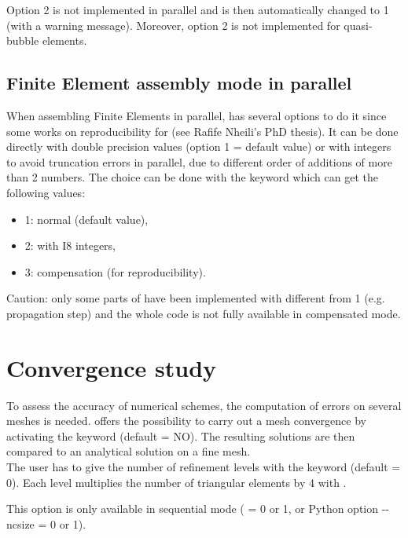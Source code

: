 Option 2 is not implemented in parallel and is then automatically changed to 1
(with a warning message).
Moreover, option 2 is not implemented for quasi-bubble elements.


\subsection{Finite Element assembly mode in parallel}

When assembling Finite Elements in parallel,  has several options
to do it since some works on reproducibility for \tel
(see Rafife Nheili's PhD thesis).
It can be done directly with double precision values
(option 1 = default value)
or with integers to avoid truncation errors in parallel, due to different
order of additions of more than 2 numbers.
The choice can be done with the keyword 
which can get the following values:
\begin{itemize}
\item 1: normal (default value),
\item 2: with I8 integers,
\item 3: compensation (for reproducibility).
\end{itemize}
Caution: only some parts of  have been implemented
with  different from 1
(e.g. propagation step) and the whole code is not fully available
in compensated mode.


\section{Convergence study}

To assess the accuracy of numerical schemes, the computation of errors
on several meshes is needed.
 offers the possibility to carry out a mesh convergence
by activating the keyword  (default = NO).
The resulting solutions are then compared to an analytical solution
on a fine mesh.\\

The user has to give the number of refinement levels with the keyword
 (default = 0).
Each level multiplies the number of triangular elements by 4 with \stbtel.

This option is only available in sequential mode
( = 0 or 1, or Python option -{}-ncsize = 0 or 1).
